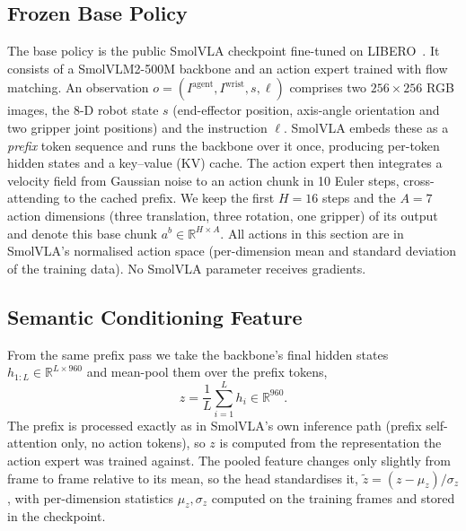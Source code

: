 \documentclass[conference]{IEEEtran}
\begin{document}
\subsection{Frozen Base Policy}
The base policy is the public SmolVLA checkpoint fine-tuned on LIBERO~\cite{smolvla}. It consists of a SmolVLM2-500M backbone and an action expert trained with flow matching. An observation $o=(I^{\text{agent}}, I^{\text{wrist}}, s, \ell)$ comprises two $256\times256$ RGB images, the 8-D robot state $s$ (end-effector position, axis-angle orientation and two gripper joint positions) and the instruction $\ell$. SmolVLA embeds these as a \emph{prefix} token sequence and runs the backbone over it once, producing per-token hidden states and a key--value (KV) cache. The action expert then integrates a velocity field from Gaussian noise to an action chunk in 10 Euler steps, cross-attending to the cached prefix. We keep the first $H=16$ steps and the $A=7$ action dimensions (three translation, three rotation, one gripper) of its output and denote this base chunk $a^{b}\in\mathbb{R}^{H\times A}$. All actions in this section are in SmolVLA's normalised action space (per-dimension mean and standard deviation of the training data). No SmolVLA parameter receives gradients.

\subsection{Semantic Conditioning Feature}
From the same prefix pass we take the backbone's final hidden states $h_{1:L}\in\mathbb{R}^{L\times 960}$ and mean-pool them over the prefix tokens,
\begin{equation}
    z=\frac{1}{L}\sum_{i=1}^{L} h_i \in \mathbb{R}^{960}.
\end{equation}
The prefix is processed exactly as in SmolVLA's own inference path (prefix self-attention only, no action tokens), so $z$ is computed from the representation the action expert was trained against. The pooled feature changes only slightly from frame to frame relative to its mean, so the head standardises it, $\tilde z=(z-\mu_z)/\sigma_z$, with per-dimension statistics $\mu_z,\sigma_z$ computed on the training frames and stored in the checkpoint.
\end{document}
